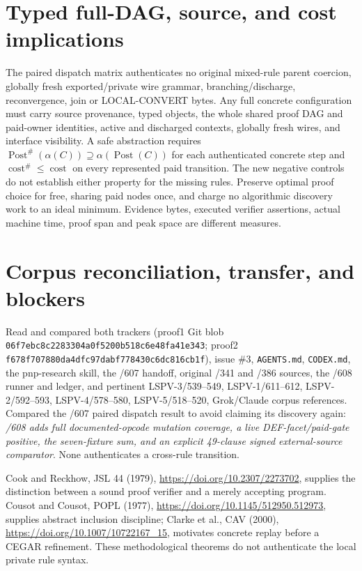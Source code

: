 \documentclass[11pt]{article}
\begin{document}
\section*{Typed full-DAG, source, and cost implications}
The paired dispatch matrix authenticates no original mixed-rule parent coercion, globally fresh exported/private wire grammar, branching/discharge, reconvergence, join or LOCAL-CONVERT bytes. Any full concrete configuration must carry source provenance, typed objects, the whole shared proof DAG and paid-owner identities, active and discharged contexts, globally fresh wires, and interface visibility. A safe abstraction requires \(\operatorname{Post}^{\#}(\alpha(C))\supseteq \alpha(\operatorname{Post}(C))\) for each authenticated concrete step and \(\operatorname{cost}^{\#}\leq\operatorname{cost}\) on every represented paid transition. The new negative controls do not establish either property for the missing rules. Preserve optimal proof choice for free, sharing paid nodes once, and charge no algorithmic discovery work to an ideal minimum. Evidence bytes, executed verifier assertions, actual machine time, proof span and peak space are different measures.

\section*{Corpus reconciliation, transfer, and blockers}
Read and compared both trackers (proof1 Git blob \texttt{06f7ebc8c2283304a0f5200b518c6e48fa41e343}; proof2 \texttt{f678f707880da4dfc97dabf778430c6dc816cb1f}), issue \#3, \texttt{AGENTS.md}, \texttt{CODEX.md}, the pnp-research skill, the /607 handoff, original /341 and /386 sources, the /608 runner and ledger, and pertinent LSPV-3/539--549, LSPV-1/611--612, LSPV-2/592--593, LSPV-4/578--580, LSPV-5/518--520, Grok/Claude corpus references. Compared the /607 paired dispatch result to avoid claiming its discovery again: \emph{/608 adds full documented-opcode mutation coverage, a live DEF-facet/paid-gate positive, the seven-fixture sum, and an explicit 49-clause signed external-source comparator}. None authenticates a cross-rule transition.

Cook and Reckhow, JSL 44 (1979), \url{https://doi.org/10.2307/2273702}, supplies the distinction between a sound proof verifier and a merely accepting program. Cousot and Cousot, POPL (1977), \url{https://doi.org/10.1145/512950.512973}, supplies abstract inclusion discipline; Clarke et al., CAV (2000), \url{https://doi.org/10.1007/10722167_15}, motivates concrete replay before a CEGAR refinement. These methodological theorems do not authenticate the local private rule syntax.
\end{document}
